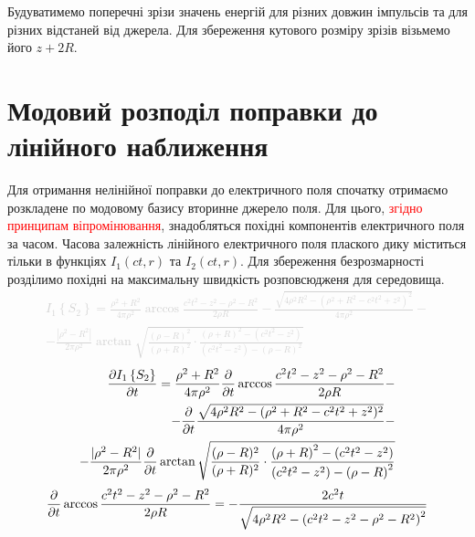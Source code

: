 Будуватимемо поперечні зрізи значень енергій
для різних довжин імпульсів та для різних відстаней від джерела.
Для збереження кутового розміру зрізів візьмемо його $ z + 2R $.

\section{Модовий розподіл поправки до лінійного наближення}
%
Для отримання нелінійної поправки до електричного поля спочатку отримаємо
розкладене по модовому базису вторинне джерело поля. Для цього, 
\textcolor{red}{згідно принципам віпромінювання}, знадобляться 
похідні компонентів електричного поля за часом. Часова залежність лінійного
електричного поля плаского дику міститься тільки в функціях 
$ I_1(ct,r) $ та $ I_2(ct,r) $. Для збереження безрозмарності розділимо
похідні на максимальну швидкість розповсюдженя для середовища.
%
\textcolor{lightgray}{ \begin{equation*} \begin{aligned}
I_1 \left\{ S_2 \right\} = \frac{\rho^2 + R^2}{4 \pi \rho^2} \arccos 
\frac{c^2 t^2 - z^2 - \rho^2 - R^2}{2 \rho R}  -
\frac{\sqrt{4 \rho^2 R^2 - (\rho^2 + R^2 - c^2t^2 + z^2)^2}}{4 \pi \rho^2} - \\
- \frac{ |\rho^2 - R^2| }{2 \pi \rho^2} 
\arctan \sqrt{ \frac{(\rho - R)^2}{(\rho + R)^2} \cdot
\frac{\left( \rho + R \right)^2 - \left( c^2t^2 - z^2 \right)} 
{\left( c^2t^2 - z^2 \right) - \left( \rho - R \right)^2} }
\end{aligned} \end{equation*} }
%
\textcolor{lightgray}{ \begin{equation*} \begin{aligned}
\frac{\partial I_1 \left\{ S_2 \right\}}{\partial t} = \frac{\rho^2 + R^2}{4 \pi \rho^2}
\frac{\partial }{\partial t} \arccos \frac{c^2 t^2 - z^2 - \rho^2 - R^2}{2 \rho R} - \\
- \frac{\partial }{\partial t} \frac{\sqrt{4 \rho^2 R^2 - (\rho^2 + R^2 - c^2t^2 + z^2)^2}}
{4 \pi \rho^2} - \\ - \frac{ |\rho^2 - R^2| }{2 \pi \rho^2} \frac{\partial }{\partial t} 
\arctan \sqrt{ \frac{(\rho - R)^2}{(\rho + R)^2} \cdot
\frac{\left( \rho + R \right)^2 - \left( c^2t^2 - z^2 \right)} 
{\left( c^2t^2 - z^2 \right) - \left( \rho - R \right)^2} }
\end{aligned} \end{equation*} }
%
\textcolor{lightgray}{ \begin{equation*} \begin{aligned}
\frac{\partial }{\partial t} \arccos \frac{c^2 t^2 - z^2 - \rho^2 - R^2}{2 \rho R} = 
- \frac{2 c^2 t}
{ \sqrt{4 \rho^2 R^2 - \left(c^2 t^2 - z^2 - \rho^2 - R^2 \right)^2} }
\end{aligned} \end{equation*} }
